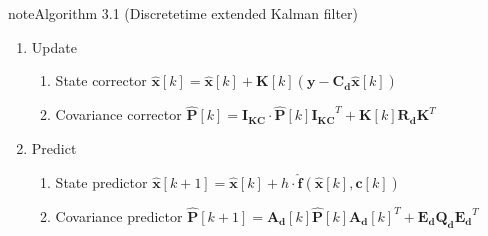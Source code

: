 \begin{sphinxadmonition}{note}{Algorithm 3.1 (Discrete\sphinxhyphen{}time extended Kalman filter)}
\begin{enumerate}
\begin{enumerate}
\begin{enumerate}
\end{enumerate}

\item {} 

Update
\begin{enumerate}
%
\item {} 

State corrector
\(\mathbf{\hat{x}}[k] = \mathbf{\hat{x}}[k] + \mathbf{K}[k] (\mathbf{y} - \mathbf{C_d} \mathbf{\hat{x}}[k]) \)

\item {} 

Covariance corrector
\(\mathbf{\hat{P}}[k] = \mathbf{I_{KC}} \cdot \mathbf{\hat{P}}[k] \mathbf{I_{KC}}^T + \mathbf{K}[k] \mathbf{R_d} \mathbf{K}^T \)

\end{enumerate}

\item {} 

Predict
\begin{enumerate}
%
\item {} 

State predictor
\(\mathbf{\hat{x}}[k+1] = \mathbf{\hat{x}}[k] + h \cdot \mathbf{\hat{f}}(\mathbf{\hat{x}}[k], \mathbf{c}[k])\)

\item {} 

Covariance predictor
\(\mathbf{\hat{P}}[k+1] = \mathbf{A_d}[k]  \mathbf{\hat{P}}[k] \mathbf{A_d}[k]^T + \mathbf{E_d} \mathbf{Q_d} \mathbf{E_d}^T \)

\end{enumerate}

\end{enumerate}

\end{enumerate}
\end{sphinxadmonition}
